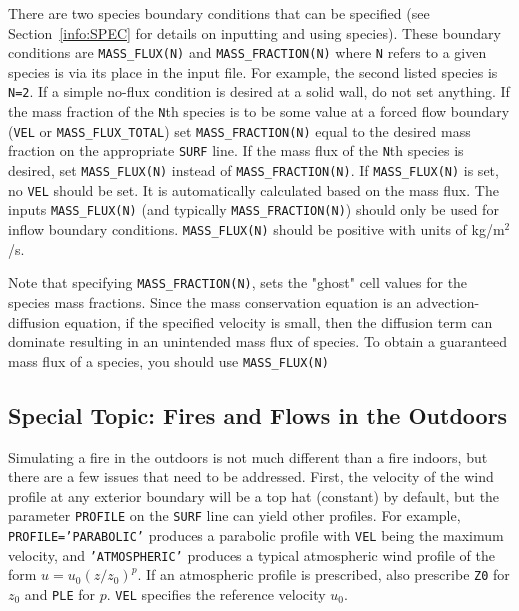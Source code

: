 \documentclass[11pt]{book}
\newcommand{\ct}{\tt\small}
\begin{document}
There are two species boundary conditions that can be specified
(see Section~\ref{info:SPEC} for details on inputting and using species).
These boundary conditions are {\ct MASS\_FLUX(N)} and {\ct MASS\_FRACTION(N)}
where {\ct N} refers to a given species is via its place in the
input file. For example, the second listed species is {\ct N=2}.
If a simple no-flux condition is desired at a solid wall, do not set
anything. If the mass fraction of the {\ct N}th species is to be some
value at a forced flow boundary ({\ct VEL} or {\ct MASS\_FLUX\_TOTAL}) set
{\ct MASS\_FRACTION(N)} equal to the desired mass fraction on the appropriate
{\ct SURF} line.
If the mass flux of the {\ct N}th species is desired, set
{\ct MASS\_FLUX(N)} instead of {\ct MASS\_FRACTION(N)}.
If {\ct MASS\_FLUX(N)}
is set, no {\ct VEL} should be set. It is automatically
calculated based on the mass flux.
The inputs {\ct MASS\_FLUX(N)} (and typically {\ct MASS\_FRACTION(N)}) should only be used
for inflow boundary conditions.  {\ct MASS\_FLUX(N)} should be positive with
units of kg/m$^2$/s.

\begin{warning}
\noindent
Note that specifying {\ct MASS\_FRACTION(N)}, sets the "ghost" cell values for the species
mass fractions.  Since the mass conservation equation is an advection-diffusion equation,
if the specified velocity is small, then the diffusion term can dominate resulting in an unintended
mass flux of species.  To obtain a guaranteed mass flux of a species, you should use {\ct MASS\_FLUX(N)}
\end{warning}


\subsection{Special Topic: Fires and Flows in the Outdoors}
\label{info:stratification}
Simulating a fire in the outdoors is not much different than a fire
indoors, but there are a few issues that need to be addressed.
First, the velocity of the wind profile at any exterior boundary will be a top hat (constant) by default,
but the parameter {\ct PROFILE} on the {\ct SURF} line
can yield other profiles.
For example, {\ct PROFILE='PARABOLIC'} produces a parabolic profile with
{\ct VEL} being the maximum velocity,
and {\ct 'ATMOSPHERIC'} produces a typical atmospheric wind
profile of the form $u=u_0 (z/z_0)^p$. If an atmospheric profile is
prescribed, also prescribe {\ct Z0} for $z_0$  and {\ct PLE} for $p$.
{\ct VEL} specifies the reference velocity $u_0$.
\end{document}
